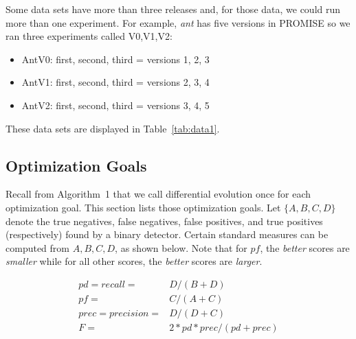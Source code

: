\documentclass[final,twocolumn,5p]{elsarticle}
\newcommand{\bi}{\begin{itemize}[leftmargin=0.4cm]}
\newcommand{\ei}{\end{itemize}}
\newcommand{\tion}[1]{\S\ref{sect:#1}}
\newcommand{\tab}[1]{Table~\ref{tab:#1}}
\begin{document}

Some data sets have more than three releases and, for those data, we could run more
 than one experiment. For example, {\em ant} has five versions in PROMISE so
 we ran three experiments called V0,V1,V2:
 \bi
 \item AntV0: first, second, third = versions 1, 2, 3
 \item AntV1: first, second, third = versions 2, 3, 4
 \item AntV2: first, second, third = versions 3, 4, 5
 \ei 
These data sets are displayed in \tab{data1}.





\subsection{Optimization Goals}

Recall from Algorithm~1 that we call differential evolution once for each
 optimization goal. This section lists those optimization goals.
Let $\{A,B,C,D\}$ denote the
true negatives, 
false negatives, 
false positives, and 
true positives
(respectively) found by a binary detector. 
Certain standard measures can be computed from
$A,B,C,D$, as shown below. Note that for $pf$, the {\em better} scores are {\em smaller}
while
for all other scores, the {\em better} scores are {\em larger}.

{\scriptsize\[
\begin{array}{ll}
pd=recall=&D/(B+D)\\
pf=&C/(A+C)\\ 
prec=precision=&D/(D+C) \\
F =&2*pd*prec/(pd + prec)
\end{array}
\]}
\end{document}
